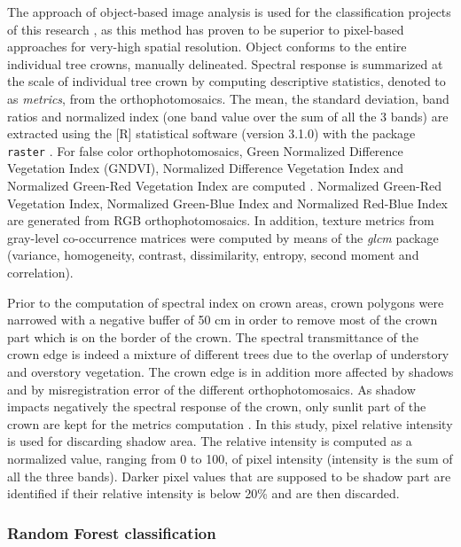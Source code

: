 \documentclass[remotesensing,article,submit,moreauthors,pdftex,12pt,a4paper]{mdpi} %
\begin{document}
The approach of object-based image analysis is used for the classification projects of this research \cite{blaschke_object_2010}, as this method has proven to be superior to pixel-based approaches for very-high spatial resolution. 
Object conforms to the entire individual tree crowns, manually delineated. 
Spectral response is summarized at the scale of individual tree crown by computing descriptive statistics, denoted to as \textit{metrics}, from the orthophotomosaics. 
The mean, the standard deviation, band ratios and normalized index (one band value over the sum of all the 3 bands) are extracted using the [R] statistical software (version 3.1.0) with the package {\tt raster} \cite{etten_raster:_2014}. 
For false color orthophotomosaics, Green Normalized Difference Vegetation Index (GNDVI), Normalized Difference Vegetation Index and Normalized Green-Red Vegetation Index are computed \cite{sripada_aerial_2006,motohka_applicability_2010}. 
Normalized Green-Red Vegetation Index, Normalized Green-Blue Index and Normalized Red-Blue Index are generated from RGB orthophotomosaics. 
In addition, texture metrics from gray-level co-occurrence matrices were computed by means of the \textit{glcm} package (variance, homogeneity, contrast, dissimilarity, entropy, second moment and correlation).

Prior to the computation of spectral index on crown areas, crown polygons were narrowed with a negative buffer of 50 cm in order to remove most of the crown part which is on the border of the crown. 
The spectral transmittance of the crown edge is indeed a mixture of different trees due to the overlap of understory and overstory vegetation. 
The crown edge is in addition more affected by shadows and by misregistration error of the different orthophotomosaics.
As shadow impacts negatively the spectral response of the crown, only sunlit part of the crown are kept for the metrics computation \cite{immitzer_tree_2012,heinzel_full_2008}. 
In this study, pixel relative intensity is used for discarding shadow area.
The relative intensity is computed as a normalized value, ranging from 0 to 100, of pixel intensity (intensity is the sum of all the three bands).
Darker pixel values that are supposed to be shadow part are identified if their relative intensity is below 20\% and are then discarded. 


\subsubsection{Random Forest classification}
\end{document}
